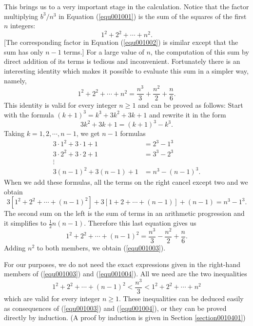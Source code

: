 \documentclass[cn,11pt,chinese]{elegantbook}
\numberwithin{equation}{section}
\begin{document}
This brings us to a very important stage in the calculation. Notice that the factor multiplying $b^3/n^3$ in Equation (\ref{equ001001}) is the sum of the squares of the first $n$ integers:
\[
1^2 + 2^2 + \cdots + n^2.
\]
[The corresponding factor in Equation (\ref{equ001002}) is similar except that the sum has only $n-1$ terms.] For a large value of $n$, the computation of this sum by direct addition of its terms is tedious and inconvenient. Fortunately there is an interesting identity which makes it possible to evaluate this sum in a simpler way, namely,
\begin{equation}\label{equ001003}
1^2 + 2^2 + \cdots + n^2 = \frac{n^3}{3} + \frac{n^2}{2} + \frac{n}{6}.
\end{equation}
This identity is valid for every integer $n \ge 1$ and can be proved as follows: Start with the formula $(k+1)^3= k^3 + 3k^2 + 3k + 1$ and rewrite it in the form
\[
3k^2 + 3k + 1 = (k+1)^3 - k^3. 
\]
Taking $k=1,2,\cdots, n-1$, we get $n-1$ formulas
\[
\begin{aligned}
3 \cdot 1^2 + 3 \cdot 1 + 1 &= 2^3 - 1^3\\
3 \cdot 2^2 + 3 \cdot 2 + 1 &= 3^3 - 2^3\\
\vdots&\\
3(n-1)^2 + 3(n-1) + 1 &= n^3 - (n-1)^3.
\end{aligned}
\]
When we add these formulas, all the terms on the right cancel except two and we obtain
\[
3[1^2+2^2+\cdots+(n-1)^2] + 3[1+2+\cdots+(n-1)] + (n-1) = n^3 - 1^3.
\]
The second sum on the left is the sum of terms in an arithmetic progression and it simplifies to $\frac{1}{2}n(n-1)$. Therefore this last equation gives us
\begin{equation}\label{equ001004}
1^2 + 2^2 + \cdots + (n-1)^2 = \frac{n^3}{3} - \frac{n^2}{2} + \frac{n}{6}.
\end{equation}
Adding $n^2$ to both members, we obtain (\ref{equ001003}).

For our purposes, we do not need the exact expressions given in the right-hand members of (\ref{equ001003}) and (\ref{equ001004}). All we need are the two inequalities
\begin{equation}\label{equ001005}
1^2 + 2^2 + \cdots + (n-1)^2 < \frac{n^3}{3} < 1^2 + 2^2 + \cdots + n^2
\end{equation}
which are valid for every integer $n \ge 1$. These inequalities can be deduced easily as consequences of (\ref{equ001003}) and (\ref{equ001004}), or they can be proved directly by induction. (A proof by induction is given in Section \ref{section0010401})
\end{document}
